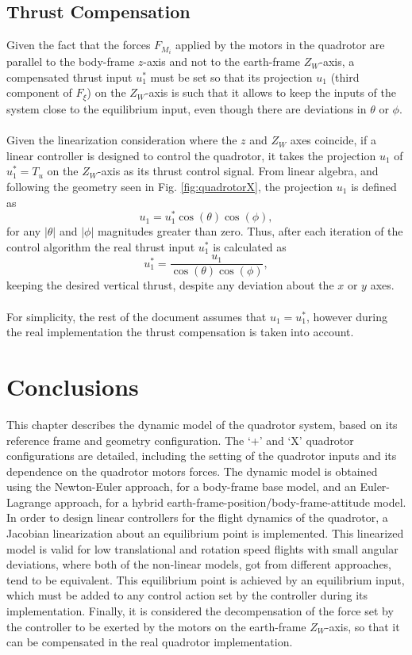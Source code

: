 \subsection{Thrust Compensation}
Given the fact that the forces $F_{M_i}$ applied by the motors in the quadrotor are parallel to the body-frame $z$-axis and not to the earth-frame $Z_W$-axis, a compensated thrust input $u_{1}^{*}$ must be set so that its projection $u_1$ (third component of $F_\xi$) on the $Z_W$-axis is such that it allows to keep the inputs of the system close to the equilibrium input, even though there are deviations in $\theta$ or $\phi$.
\\\\
Given the linearization consideration where the $z$ and $Z_W$ axes coincide, if a linear controller is designed to control the quadrotor, it takes the projection $u_{1}$ of $u_{1}^{*} = T_{u}$ on the $Z_W$-axis as its thrust control signal. From linear algebra, and following the geometry seen in Fig. \ref{fig:quadrotorX}, the projection $u_{1}$ is defined as
\begin{equation}
u_{1} = u_{1}^{*}\cos(\theta)\cos(\phi),
\end{equation}
for any $|\theta|$ and $|\phi|$ magnitudes greater than zero. Thus, after each iteration of the control algorithm the real thrust input $u_{1}^{*}$ is calculated as
\begin{equation}
u_{1}^{*} = \dfrac{u_{1}}{\cos(\theta)\cos(\phi)},
\end{equation}
keeping the desired vertical thrust, despite any deviation about the $x$ or $y$ axes. 
\\\\For simplicity, the rest of the document assumes that $u_1 = u_{1}^{*}$, however during the real implementation the thrust compensation is taken into account.
\section{Conclusions}
This chapter describes the dynamic model of the quadrotor system, based on its reference frame and geometry configuration. The `+' and `X' quadrotor configurations are detailed, including the setting of the quadrotor inputs and its dependence on the quadrotor motors forces. The dynamic model is obtained using the Newton-Euler approach, for a body-frame base model, and an Euler-Lagrange approach, for a hybrid earth-frame-position/body-frame-attitude model. In order to design linear controllers for the flight dynamics of the quadrotor, a Jacobian linearization about an equilibrium point is implemented. This linearized model is valid for low translational and rotation speed flights with small angular deviations, where both of the non-linear models, got from different approaches, tend to be equivalent. This equilibrium point is achieved by an equilibrium input, which must be added to any control action set by the controller during its implementation.  Finally, it is considered the decompensation of the force set by the controller to be exerted by the motors on the earth-frame $Z_W$-axis, so that it can be compensated in the real quadrotor implementation.
